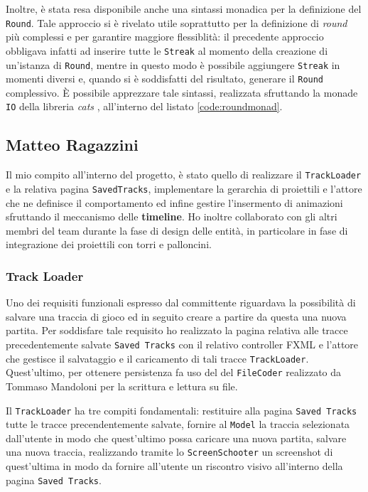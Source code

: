 Inoltre, è stata resa disponibile anche una sintassi monadica per la definizione del \texttt{Round}. Tale approccio si è
rivelato utile soprattutto per la definizione di \textit{round} più complessi e per garantire maggiore flessiblità: il
precedente approccio obbligava infatti ad inserire tutte le \texttt{Streak} al momento della creazione di un'istanza di
\texttt{Round}, mentre in questo modo è possibile aggiungere \texttt{Streak} in momenti diversi e, quando si è
soddisfatti del risultato, generare il \texttt{Round} complessivo. È possibile apprezzare tale sintassi, realizzata
sfruttando la monade \texttt{IO} della libreria \textit{cats} \cite{cats-effects}, all'interno del listato
\ref{code:roundmonad}.


\subsection{Matteo Ragazzini}\label{subsec:matteo-ragazzini}
Il mio compito all'interno del progetto, è stato quello di realizzare il \texttt{TrackLoader} e la relativa pagina
\texttt{SavedTracks}, implementare la gerarchia di proiettili e l'attore che ne definisce il comportamento ed infine
gestire l'insermento di animazioni sfruttando il meccanismo delle \textbf{timeline}.
Ho inoltre collaborato con gli altri membri del team durante la fase di design delle entità, in particolare
in fase di integrazione dei proiettili con torri e palloncini.


\subsubsection{Track Loader}\label{subsec:track-loader}
Uno dei requisiti funzionali espresso dal committente riguardava la possibilità di salvare una traccia di gioco ed in seguito
creare a partire da questa una nuova partita. Per soddisfare tale requisito ho realizzato la pagina relativa alle
tracce precedentemente salvate \texttt{Saved Tracks} con il relativo controller FXML e l'attore che gestisce il salvataggio
e il caricamento di tali tracce \texttt{TrackLoader}. Quest'ultimo, per ottenere persistenza fa uso del
del \texttt{FileCoder} realizzato da Tommaso Mandoloni per la scrittura e lettura su file.

Il \texttt{TrackLoader} ha tre compiti fondamentali: restituire alla pagina \texttt{Saved Tracks} tutte le tracce precendentemente salvate,
fornire al \texttt{Model} la traccia selezionata dall'utente in modo che quest'ultimo possa caricare una nuova partita,
salvare una nuova traccia, realizzando tramite lo \texttt{ScreenSchooter} un screenshot di quest'ultima
in modo da fornire all'utente un riscontro visivo all'interno della pagina \texttt{Saved Tracks}.

